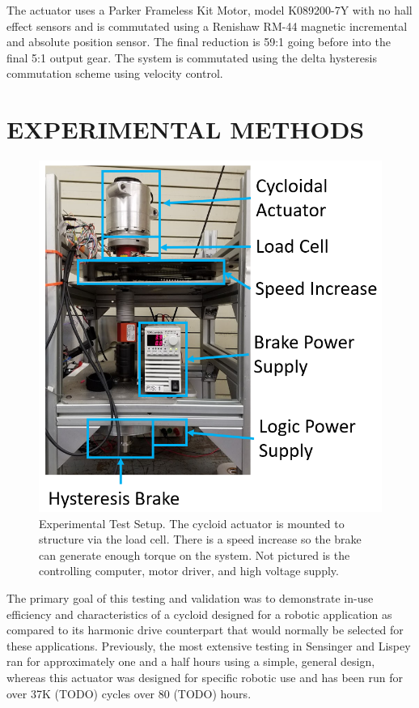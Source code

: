 \documentclass[letterpaper, 10 pt, conference]{ieeeconf}  %
\begin{document}
The actuator uses a Parker Frameless Kit Motor, model K089200-7Y with no hall effect sensors and is commutated using a Renishaw RM-44 magnetic incremental and absolute position sensor. The final reduction is 59:1 going before into the final 5:1 output gear. The system is commutated using the delta hysteresis commutation scheme \cite{electric_machines} using velocity control. 

\section{EXPERIMENTAL METHODS}\label{methods}

   \begin{figure}[!b]
      \centering
      \includegraphics[width=0.75\linewidth]{test_stand}
      \caption{Experimental Test Setup. The cycloid actuator is mounted to structure via the load cell. There is a speed increase so the brake can generate enough torque on the system. Not pictured is the controlling computer, motor driver, and high voltage supply.}
      \label{test_setup}
   \end{figure}
   
The primary goal of this testing and validation was to demonstrate in-use efficiency and characteristics of a cycloid designed for a robotic application as compared to its harmonic drive counterpart that would normally be selected for these applications. Previously, the most extensive testing in Sensinger and Lispey ran for approximately one and a half hours \cite{unified_approach} using a simple, general design, whereas this actuator was designed for specific robotic use and has been run for over 37K (TODO) cycles over 80 (TODO) hours. 
\end{document}
